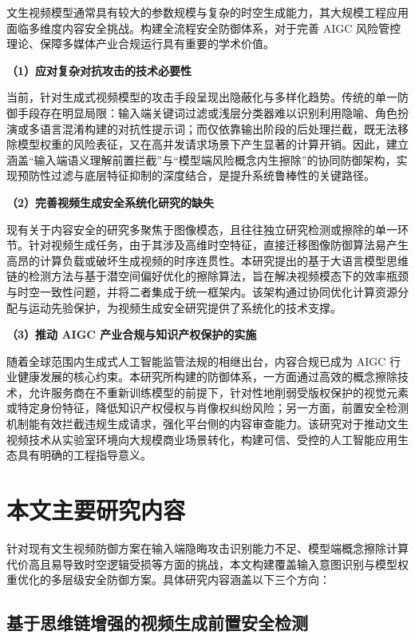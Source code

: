 文生视频模型通常具有较大的参数规模与复杂的时空生成能力，其大规模工程应用面临多维度内容安全挑战。构建全流程安全防御体系，对于完善 AIGC 风险管控理论、保障多媒体产业合规运行具有重要的学术价值。

\textbf{（1）应对复杂对抗攻击的技术必要性} 

当前，针对生成式视频模型的攻击手段呈现出隐蔽化与多样化趋势。传统的单一防御手段存在明显局限：输入端关键词过滤或浅层分类器难以识别利用隐喻、角色扮演或多语言混淆构建的对抗性提示词；而仅依靠输出阶段的后处理拦截，既无法移除模型权重的风险表征，又在高并发请求场景下产生显著的计算开销。因此，建立涵盖“输入端语义理解前置拦截”与“模型端风险概念内生擦除”的协同防御架构，实现预防性过滤与底层特征抑制的深度结合，是提升系统鲁棒性的关键路径。

\textbf{（2）完善视频生成安全系统化研究的缺失} 

现有关于内容安全的研究多聚焦于图像模态，且往往独立研究检测或擦除的单一环节。针对视频生成任务，由于其涉及高维时空特征，直接迁移图像防御算法易产生高昂的计算负载或破坏生成视频的时序连贯性。本研究提出的基于大语言模型思维链的检测方法与基于潜空间偏好优化的擦除算法，旨在解决视频模态下的效率瓶颈与时空一致性问题，并将二者集成于统一框架内。该架构通过协同优化计算资源分配与运动先验保护，为视频生成安全研究提供了系统化的技术支撑。

\textbf{（3）推动 AIGC 产业合规与知识产权保护的实施} 

随着全球范围内生成式人工智能监管法规的相继出台，内容合规已成为 AIGC 行业健康发展的核心约束。本研究所构建的防御体系，一方面通过高效的概念擦除技术，允许服务商在不重新训练模型的前提下，针对性地削弱受版权保护的视觉元素或特定身份特征，降低知识产权侵权与肖像权纠纷风险；另一方面，前置安全检测机制能有效拦截违规生成请求，强化平台侧的内容审查能力。该研究对于推动文生视频技术从实验室环境向大规模商业场景转化，构建可信、受控的人工智能应用生态具有明确的工程指导意义。

\section{本文主要研究内容}

针对现有文生视频防御方案在输入端隐晦攻击识别能力不足、模型端概念擦除计算代价高且易导致时空逻辑受损等方面的挑战，本文构建覆盖输入意图识别与模型权重优化的多层级安全防御方案。具体研究内容涵盖以下三个方向：

\subsection{基于思维链增强的视频生成前置安全检测}

